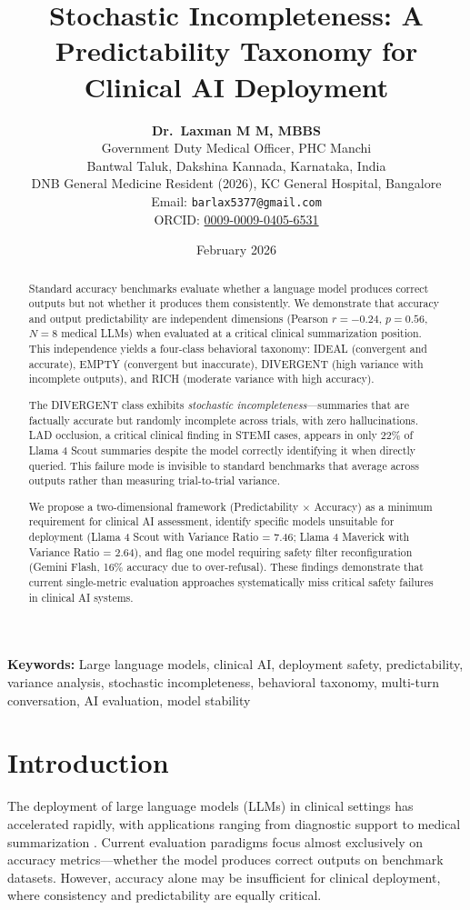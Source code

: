 \documentclass[11pt]{article}
\title{\textbf{Stochastic Incompleteness: A Predictability Taxonomy for Clinical AI Deployment}}
\author{
\textbf{Dr.\ Laxman M M, MBBS}\\
Government Duty Medical Officer, PHC Manchi\\
Bantwal Taluk, Dakshina Kannada, Karnataka, India\\
DNB General Medicine Resident (2026), KC General Hospital, Bangalore\\
Email: \texttt{barlax5377@gmail.com}\\
ORCID: \href{https://orcid.org/0009-0009-0405-6531}{0009-0009-0405-6531}
}
\date{February 2026}
\begin{document}
\maketitle

\begin{abstract}
Standard accuracy benchmarks evaluate whether a language model produces correct outputs but not whether it produces them consistently. We demonstrate that accuracy and output predictability are independent dimensions (Pearson $r = -0.24$, $p = 0.56$, $N = 8$ medical LLMs) when evaluated at a critical clinical summarization position. This independence yields a four-class behavioral taxonomy: IDEAL (convergent and accurate), EMPTY (convergent but inaccurate), DIVERGENT (high variance with incomplete outputs), and RICH (moderate variance with high accuracy).

The DIVERGENT class exhibits \textit{stochastic incompleteness}---summaries that are factually accurate but randomly incomplete across trials, with zero hallucinations. LAD occlusion, a critical clinical finding in STEMI cases, appears in only 22\% of Llama 4 Scout summaries despite the model correctly identifying it when directly queried. This failure mode is invisible to standard benchmarks that average across outputs rather than measuring trial-to-trial variance.

We propose a two-dimensional framework (Predictability $\times$ Accuracy) as a minimum requirement for clinical AI assessment, identify specific models unsuitable for deployment (Llama 4 Scout with Variance Ratio = 7.46; Llama 4 Maverick with Variance Ratio = 2.64), and flag one model requiring safety filter reconfiguration (Gemini Flash, 16\% accuracy due to over-refusal). These findings demonstrate that current single-metric evaluation approaches systematically miss critical safety failures in clinical AI systems.
\end{abstract}

\textbf{Keywords:} Large language models, clinical AI, deployment safety, predictability, variance analysis, stochastic incompleteness, behavioral taxonomy, multi-turn conversation, AI evaluation, model stability

\section{Introduction}

The deployment of large language models (LLMs) in clinical settings has accelerated rapidly, with applications ranging from diagnostic support to medical summarization \citep{singhal2023large, thirunavukarasu2023large}. Current evaluation paradigms focus almost exclusively on accuracy metrics---whether the model produces correct outputs on benchmark datasets. However, accuracy alone may be insufficient for clinical deployment, where consistency and predictability are equally critical.
\end{document}
